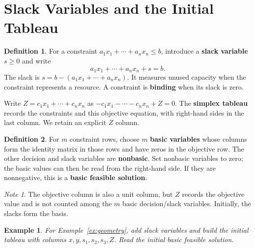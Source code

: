 \documentclass{article}
\theoremstyle{plain}
\newtheorem{example}{Example}[section]
\theoremstyle{definition}
\newtheorem{definition}{Definition}[section]
\theoremstyle{remark}
\newtheorem*{note}{Note}
\newcommand{\work}{\par\vfill}
\begin{document}
\newpage
\section{Slack Variables and the Initial Tableau}
\begin{definition}
For a constraint $a_1x_1+\cdots+a_nx_n\le b$, introduce a \textbf{slack variable} $s\ge0$ and write
\[
a_1x_1+\cdots+a_nx_n+s=b.
\]
The slack is $s=b-(a_1x_1+\cdots+a_nx_n)$. It measures unused capacity when the constraint represents a resource. A constraint is \textbf{binding} when its slack is zero.
\end{definition}
Write $Z=c_1x_1+\cdots+c_nx_n$ as $-c_1x_1-\cdots-c_nx_n+Z=0$. The \textbf{simplex tableau} records the constraints and this objective equation, with right-hand sides in the last column. We retain an explicit $Z$ column.
\begin{definition}
For $m$ constraint rows, choose $m$ \textbf{basic variables} whose columns form the identity matrix in those rows and have zeros in the objective row. The other decision and slack variables are \textbf{nonbasic}. Set nonbasic variables to zero; the basic values can then be read from the right-hand side. If they are nonnegative, this is a \textbf{basic feasible solution}.
\end{definition}
\begin{note}
The objective column is also a unit column, but $Z$ records the objective value and is not counted among the $m$ basic decision/slack variables. Initially, the slacks form the basis.
\end{note}
\begin{example}\label{ex:setup}
For Example~\ref{ex:geometry}, add slack variables and build the initial tableau with columns $x,y,s_1,s_2,s_3,Z$. Read the initial basic feasible solution.
\end{example}

\work

\newpage
\end{document}
